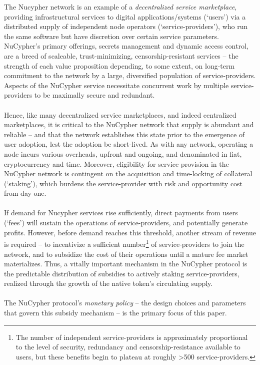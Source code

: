 \documentclass[longbibliography,nofootinbib]{revtex4-1}
\begin{document}
The Nucypher network is an example of a \textit{decentralized service marketplace}, providing infrastructural services to digital applications/systems (`users') via a distributed supply of independent node operators (`service-providers'), who run the same software but have discretion over certain service parameters. NuCypher's primary offerings, secrets management and dynamic access control, are a breed of scaleable, trust-minimizing, censorship-resistant services – the strength of each value proposition depending, to some extent, on long-term commitment to the network by a large, diversified population of service-providers. Aspects of the NuCypher service necessitate concurrent work by multiple service-providers to be maximally secure and redundant.
\\\\
Hence, like many decentralized service marketplaces, and indeed centralized marketplaces, it is critical to the NuCypher network that supply is abundant and reliable – and that the network establishes this state prior to the emergence of user adoption, lest the adoption be short-lived. As with any network, operating a node incurs various overheads, upfront and ongoing, and denominated in fiat, cryptocurrency and time. Moreover, eligibility for service provision in the NuCypher network is contingent on the acquisition and time-locking of collateral (`staking'), which burdens the service-provider with risk and opportunity cost from day one.
\\\\
If demand for Nucypher services rise sufficiently, direct payments from users (`fees') will sustain the operations of service-providers, and potentially generate profits. However, before demand reaches this threshold, another stream of revenue is required – to incentivize a sufficient number\footnote[1]{The number of independent service-providers is approximately proportional to the level of security, redundancy and censorship-resistance available to users, but these benefits begin to plateau at roughly >500 service-providers.} of service-providers to join the network, and to subsidize the cost of their operations until a mature fee market materializes. Thus, a vitally important mechanism in the NuCypher protocol is the predictable distribution of subsidies to actively staking service-providers, realized through the growth of the native token's circulating supply. 
\\\\
The NuCypher protocol's \textit{monetary policy} – the design choices and parameters that govern this subsidy mechanism – is the primary focus of this paper. 
\end{document}
